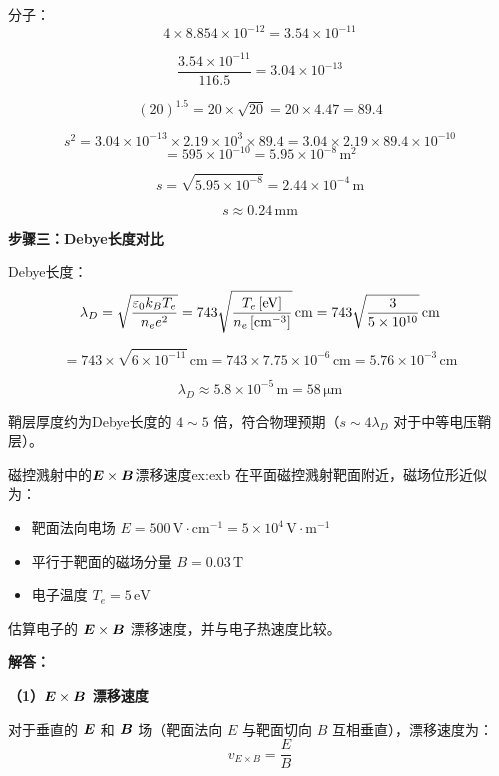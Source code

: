 分子：
\[
    4\times8.854\times10^{-12} = 3.54\times10^{-11}
\]

\[
    \frac{3.54\times10^{-11}}{116.5} = 3.04\times10^{-13}
\]

\[
    (20)^{1.5} = 20\times\sqrt{20} = 20\times4.47 = 89.4
\]

\[
    s^2 = 3.04\times10^{-13} \times 2.19\times10^3 \times 89.4 = 3.04\times2.19\times89.4\times10^{-10}
\]
\[
    = 595\times10^{-10} = 5.95\times10^{-8}\,\mathrm{m^2}
\]

\[
    s = \sqrt{5.95\times10^{-8}} = 2.44\times10^{-4}\,\mathrm{m}
\]

\[
    \boxed{s \approx 0.24\,\mathrm{mm}}
\]

\textbf{步骤三：Debye长度对比}

Debye长度：
\begin{equation}
    \lambda_D = \sqrt{\frac{\varepsilon_0 k_B T_e}{n_e e^2}} = 743\sqrt{\frac{T_e\,[\mathrm{eV}]}{n_e\,[\mathrm{cm^{-3}}]}}\,\mathrm{cm} = 743\sqrt{\frac{3}{5\times10^{10}}}\,\mathrm{cm}
\label{eq:ch11-debye-length}
\end{equation}

\[
    = 743\times\sqrt{6\times10^{-11}}\,\mathrm{cm} = 743\times7.75\times10^{-6}\,\mathrm{cm} = 5.76\times10^{-3}\,\mathrm{cm}
\]

\[
    \lambda_D \approx 5.8\times10^{-5}\,\mathrm{m} = 58\,\mathrm{\mu m}
\]

鞘层厚度约为Debye长度的 $4\sim5$ 倍，符合物理预期（$s\sim 4\lambda_D$ 对于中等电压鞘层）。


\begin{example}{磁控溅射中的$\bm{E}\times\bm{B}$漂移速度}{ex:exb}
在平面磁控溅射靶面附近，磁场位形近似为：
\begin{itemize}
    \item 靶面法向电场 $E = 500\,\mathrm{V\cdot cm^{-1}} = 5\times10^4\,\mathrm{V\cdot m^{-1}}$
    \item 平行于靶面的磁场分量 $B = 0.03\,\mathrm{T}$
    \item 电子温度 $T_e = 5\,\mathrm{eV}$
\end{itemize}
估算电子的 $\bm{E}\times\bm{B}$ 漂移速度，并与电子热速度比较。
\end{example}

\textbf{解答：}

\textbf{（1）$\bm{E}\times\bm{B}$ 漂移速度}

对于垂直的 $\bm{E}$ 和 $\bm{B}$ 场（靶面法向 $E$ 与靶面切向 $B$ 互相垂直），漂移速度为：
\begin{equation}
    v_{E\times B} = \frac{E}{B}
\label{eq:ch11-exb-drift}
\end{equation}

